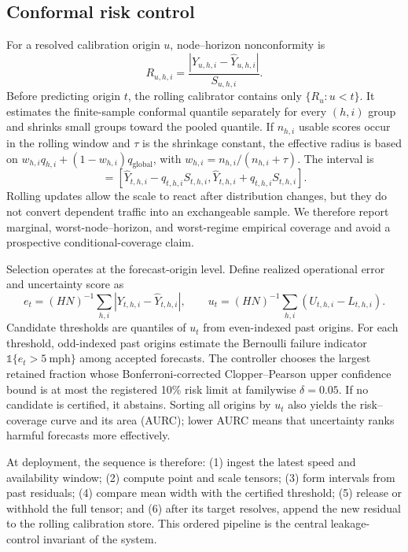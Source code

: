 \documentclass[pdflatex,sn-mathphys-num]{sn-jnl}
\begin{document}
\subsection{Conformal risk control}
For a resolved calibration origin $u$, node--horizon nonconformity is
\begin{equation}
 R_{u,h,i}=\frac{|Y_{u,h,i}-\hat Y_{u,h,i}|}{S_{u,h,i}}.
\end{equation}
Before predicting origin $t$, the rolling calibrator contains only
$\{R_u:u<t\}$. It estimates the finite-sample conformal quantile separately for
every $(h,i)$ group and shrinks small groups toward the pooled quantile. If
$n_{h,i}$ usable scores occur in the rolling window and $\tau$ is the shrinkage
constant, the effective radius is based on
$w_{h,i}q_{h,i}+(1-w_{h,i})q_{\mathrm{global}}$, with
$w_{h,i}=n_{h,i}/(n_{h,i}+\tau)$. The interval is
\begin{equation}
 [L_{t,h,i},U_{t,h,i}]=
 [\hat Y_{t,h,i}-q_{t,h,i}S_{t,h,i},
  \hat Y_{t,h,i}+q_{t,h,i}S_{t,h,i}].
\end{equation}
Rolling updates allow the scale to react after distribution changes, but they
do not convert dependent traffic into an exchangeable sample. We therefore
report marginal, worst-node--horizon, and worst-regime empirical coverage and
avoid a prospective conditional-coverage claim.

Selection operates at the forecast-origin level. Define realized operational
error and uncertainty score as
\begin{equation}
 e_t=(HN)^{-1}\sum_{h,i}|Y_{t,h,i}-\hat Y_{t,h,i}|,
 \qquad
 u_t=(HN)^{-1}\sum_{h,i}(U_{t,h,i}-L_{t,h,i}).
\end{equation}
Candidate thresholds are quantiles of $u_t$ from even-indexed past origins.
For each threshold, odd-indexed past origins estimate the Bernoulli failure
indicator $\mathbb{1}\{e_t>5\ \mathrm{mph}\}$ among accepted forecasts. The
controller chooses the largest retained fraction whose Bonferroni-corrected
Clopper--Pearson upper confidence bound is at most the registered 10\% risk
limit at familywise $\delta=0.05$. If no candidate is certified, it abstains.
Sorting all origins by $u_t$ also yields the risk--coverage curve and its area
(AURC); lower AURC means that uncertainty ranks harmful forecasts more
effectively.

At deployment, the sequence is therefore: (1) ingest the latest speed and
availability window; (2) compute point and scale tensors; (3) form intervals
from past residuals; (4) compare mean width with the certified threshold; (5)
release or withhold the full tensor; and (6) after its target resolves, append
the new residual to the rolling calibration store. This ordered pipeline is the
central leakage-control invariant of the system.
\end{document}
